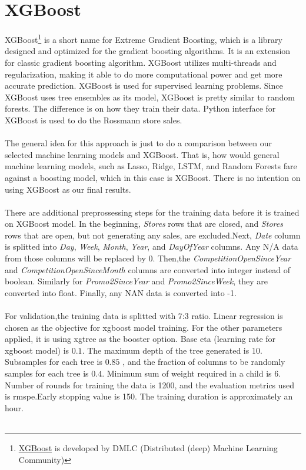 \chapter{XGBoost}
XGBoost\footnote{\href{https:https://github.com/dmlc/xgboost}{XGBoost} is developed by DMLC (Distributed (deep) Machine Learning Community)} is a short name for Extreme Gradient Boosting, which is a library designed and optimized for the gradient boosting algorithms. It is an extension for classic gradient boosting algorithm. XGBoost utilizes multi-threads and regularization, making it able to do more computational power and get more accurate prediction. XGBoost is used for supervised learning problems. Since XGBoost uses tree ensembles as its model, XGBoost is pretty similar to random forests. The difference is on how they train their data. Python interface for XGBoost is used to do the Rossmann store sales. \\ \\
The general idea for this approach is just to do a comparison between our selected machine learning models and XGBoost. That is, how would general machine learning models, such as Lasso, Ridge, LSTM, and Random Forests fare against a boosting model, which in this case is XGBoost. There is no intention on using XGBoost as our final results.\\ \\
There are additional preprossessing steps for the training data before it is trained on XGBoost model. In the beginning, \textit{Stores} rows that are closed, and \textit{Stores} rows that are open, but not generating any sales, are excluded.Next, \textit{Date} column is splitted into \textit{Day}, \textit{Week}, \textit{Month}, \textit{Year}, and \textit{DayOfYear} columns. Any N/A data from those columns will be replaced by 0. Then,the \textit{CompetitionOpenSinceYear} and \textit{CompetitionOpenSinceMonth} columns are converted into integer instead of boolean. Similarly for \textit{Promo2SinceYear} and \textit{Promo2SinceWeek}, they are converted into float. Finally, any NAN data is converted into -1. \\ \\
For validation,the training data is splitted with 7:3 ratio. Linear regression is chosen as the objective for xgboost model training. For the other parameters applied, it is using xgtree as the booster option. Base eta (learning rate for xgboost model) is $0.1$. The maximum depth of the tree generated is 10. Subsamples for each tree is $0.85$ , and the fraction of columns to be randomly samples for each tree is $0.4$. Minimum sum of weight required in a child is 6. Number of rounds for training the data is 1200, and the evaluation metrics used is rmspe.Early stopping value is 150. The training duration is approximately an hour.\\ \\ 
